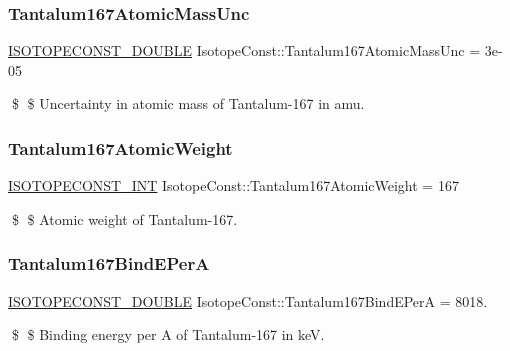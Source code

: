 \subsubsection{\texorpdfstring{Tantalum167\+Atomic\+Mass\+Unc}{Tantalum167AtomicMassUnc}}
{\footnotesize\ttfamily \mbox{\hyperlink{group___isotope_const-_macros_ga8f45a7272ce02c0b4c65c44636ed719a}{I\+S\+O\+T\+O\+P\+E\+C\+O\+N\+S\+T\+\_\+\+D\+O\+U\+B\+LE}} Isotope\+Const\+::\+Tantalum167\+Atomic\+Mass\+Unc = 3e-\/05}

\$ \$ Uncertainty in atomic mass of Tantalum-\/167 in amu. \mbox{\label{group___isotope_const-_tantalum-_ta167_gacbe060dd635fa9d0a767d170a633073e}} 
\subsubsection{\texorpdfstring{Tantalum167\+Atomic\+Weight}{Tantalum167AtomicWeight}}
{\footnotesize\ttfamily \mbox{\hyperlink{group___isotope_const-_macros_ga5f18360b3e99483a35c32d789e62621c}{I\+S\+O\+T\+O\+P\+E\+C\+O\+N\+S\+T\+\_\+\+I\+NT}} Isotope\+Const\+::\+Tantalum167\+Atomic\+Weight = 167}

\$ \$ Atomic weight of Tantalum-\/167. \mbox{\label{group___isotope_const-_tantalum-_ta167_ga6eb8c662d280e10fa252e1221df15c90}} 
\subsubsection{\texorpdfstring{Tantalum167\+Bind\+E\+PerA}{Tantalum167BindEPerA}}
{\footnotesize\ttfamily \mbox{\hyperlink{group___isotope_const-_macros_ga8f45a7272ce02c0b4c65c44636ed719a}{I\+S\+O\+T\+O\+P\+E\+C\+O\+N\+S\+T\+\_\+\+D\+O\+U\+B\+LE}} Isotope\+Const\+::\+Tantalum167\+Bind\+E\+PerA = 8018.}

\$ \$ Binding energy per A of Tantalum-\/167 in keV. \mbox{\label{group___isotope_const-_tantalum-_ta167_gab4d799d72ac4e7ccc2010ccb1f1bfb0c}} 
